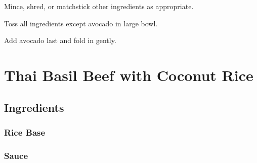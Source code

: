 \documentclass[ansiapaper,10pt,english]{sphinxmanual}
\begin{document}
Mince, shred, or matchstick other ingredients as appropriate.

Toss all ingredients except avocado in large bowl.

Add avocado last and fold in gently.


\chapter{Thai Basil Beef with Coconut Rice}
\label{\detokenize{Thai_Basil_Beef:thai-basil-beef-with-coconut-rice}}\label{\detokenize{Thai_Basil_Beef::doc}}

\section{Ingredients}
\label{\detokenize{Thai_Basil_Beef:ingredients}}

\subsection{Rice Base}
\label{\detokenize{Thai_Basil_Beef:rice-base}}
%
\begin{sphinxVerbatim}[commandchars=\\\{\}]
   

   

  

     

         

    
\end{sphinxVerbatim}


\subsection{Sauce}
\label{\detokenize{Thai_Basil_Beef:sauce}}
%
\begin{sphinxVerbatim}[commandchars=\\\{\}]
   

  

   

  

  

    

   

    
\end{sphinxVerbatim}
\end{document}

